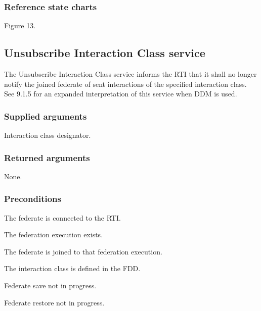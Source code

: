 \clearpage

\begin{compactstdpage}
    \subsubsection{Reference state charts}
    \begin{stdalphalist}
        \item Figure 13.
    \end{stdalphalist}

    \subsection{Unsubscribe Interaction Class service}

    The Unsubscribe Interaction Class service informs the RTI that it shall no longer notify the joined federate of sent interactions of the specified interaction class. See 9.1.5 for an expanded interpretation of this service when DDM is used.

    \subsubsection{Supplied arguments}
    \begin{stdalphalist}
        \item Interaction class designator.
    \end{stdalphalist}

    \subsubsection{Returned arguments}
    \begin{stdalphalist}
        \item None.
    \end{stdalphalist}

    \subsubsection{Preconditions}
    \begin{stdalphalist}
        \item The federate is connected to the RTI.
        \item The federation execution exists.
        \item The federate is joined to that federation execution.
        \item The interaction class is defined in the FDD.
        \item Federate save not in progress.
        \item Federate restore not in progress.
    \end{stdalphalist}


\end{compactstdpage}
